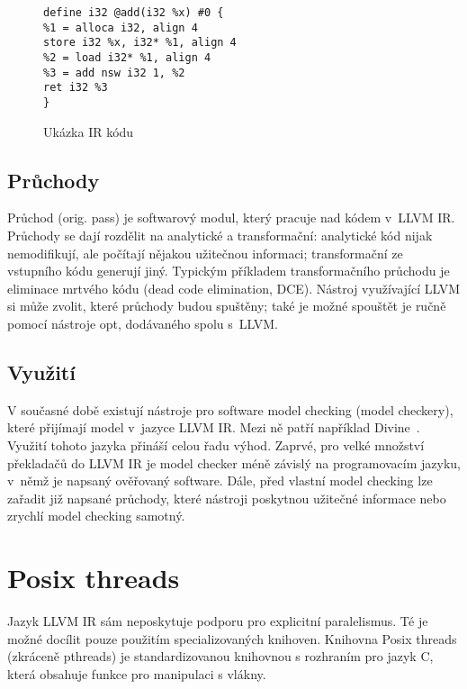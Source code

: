 \documentclass[12pt]{fithesis2}
\begin{document}
\begin{figure}[h!]
\begin{lstlisting}
define i32 @add(i32 %x) #0 {
%1 = alloca i32, align 4
store i32 %x, i32* %1, align 4
%2 = load i32* %1, align 4
%3 = add nsw i32 1, %2
ret i32 %3
}
\end{lstlisting}
\caption{Ukázka IR kódu}
\label{IR-EX}
\end{figure}

\subsection{Průchody}
Průchod (orig. pass) je softwarový modul, který pracuje nad kódem v~LLVM IR. Průchody se dají rozdělit na analytické a transformační: analytické kód nijak nemodifikují, ale počítají nějakou užitečnou informaci; transformační ze vstupního kódu generují jiný. Typickým příkladem transformačního průchodu je eliminace mrtvého kódu (dead code elimination, DCE). Nástroj využívající LLVM si může zvolit, které průchody budou spuštěny; také je možné spouštět je ručně pomocí nástroje opt, dodávaného spolu s~LLVM.

\subsection{Využití}
V současné době existují nástroje pro software model checking (model checkery), které přijímají model v~jazyce LLVM IR. Mezi ně patří například Divine~\cite{BBH+13}. Využití tohoto jazyka přináší celou řadu výhod. Zaprvé, pro velké množství překladačů do LLVM IR je model checker méně závislý na programovacím jazyku, v~němž je napsaný ověřovaný software. Dále, před vlastní model checking lze zařadit již napsané průchody, které nástroji poskytnou užitečné informace nebo zrychlí model checking samotný.



\section{Posix threads}
\label{sec:posix-threads}
Jazyk LLVM IR sám neposkytuje podporu pro explicitní paralelismus. Té je možné docílit pouze použitím specializovaných knihoven. Knihovna Posix threads (zkráceně pthreads) je standardizovanou knihovnou s rozhraním pro jazyk C, která obsahuje funkce pro manipulaci s vlákny.
\end{document}
